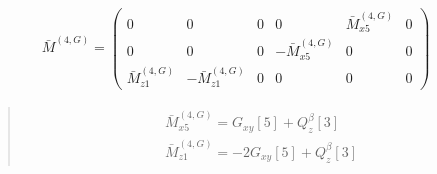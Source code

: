 \documentclass[fleqn,10pt]{jsarticle}
\begin{document}
\begin{align*}
\bar{M}^{(4,G)} = \begin{pmatrix} 0 & 0 & 0 & 0 & \bar{M}^{(4,G)}_{x5} & 0 \\ 0 & 0 & 0 & - \bar{M}^{(4,G)}_{x5} & 0 & 0 \\ \bar{M}^{(4,G)}_{z1} & - \bar{M}^{(4,G)}_{z1} & 0 & 0 & 0 & 0 \end{pmatrix}
\end{align*}
\begin{quote}
\begin{align*}
& \bar{M}^{(4,G)}_{x5} = G_{xy}[5] + Q_{z}^{\beta}[3] \\
& \bar{M}^{(4,G)}_{z1} = - 2 G_{xy}[5] + Q_{z}^{\beta}[3]
\end{align*}
\end{quote}
\end{document}
